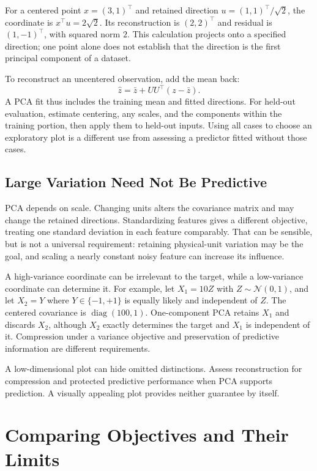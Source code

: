 For a centered point $x=(3,1)^\top$ and retained direction $u=(1,1)^\top/\sqrt2$, the coordinate is $x^\top u=2\sqrt2$. Its reconstruction is $(2,2)^\top$ and residual is $(1,-1)^\top$, with squared norm $2$. This calculation projects onto a specified direction; one point alone does not establish that the direction is the first principal component of a dataset.

To reconstruct an uncentered observation, add the mean back:
\[
\hat z=\bar z+UU^\top(z-\bar z).
\]
A PCA fit thus includes the training mean and fitted directions. For held-out evaluation, estimate centering, any scales, and the components within the training portion, then apply them to held-out inputs. Using all cases to choose an exploratory plot is a different use from assessing a predictor fitted without those cases.

\subsection{Large Variation Need Not Be Predictive}

PCA depends on scale. Changing units alters the covariance matrix and may change the retained directions. Standardizing features gives a different objective, treating one standard deviation in each feature comparably. That can be sensible, but is not a universal requirement: retaining physical-unit variation may be the goal, and scaling a nearly constant noisy feature can increase its influence.

A high-variance coordinate can be irrelevant to the target, while a low-variance coordinate can determine it. For example, let $X_1=10Z$ with $Z\sim\mathcal N(0,1)$, and let $X_2=Y$ where $Y\in\{-1,+1\}$ is equally likely and independent of $Z$. The centered covariance is $\operatorname{diag}(100,1)$. One-component PCA retains $X_1$ and discards $X_2$, although $X_2$ exactly determines the target and $X_1$ is independent of it. Compression under a variance objective and preservation of predictive information are different requirements.

A low-dimensional plot can hide omitted distinctions. Assess reconstruction for compression and protected predictive performance when PCA supports prediction. A visually appealing plot provides neither guarantee by itself.

\section{Comparing Objectives and Their Limits}

